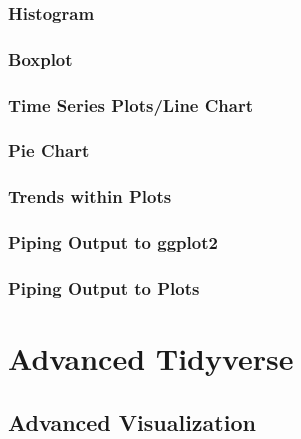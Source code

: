 \documentclass[
]{book}
\begin{document}
\hypertarget{histogram}{%
\subsection{Histogram}\label{histogram}}

\hypertarget{boxplot}{%
\subsection{Boxplot}\label{boxplot}}

\hypertarget{time-series-plotsline-chart}{%
\subsection{Time Series Plots/Line Chart}\label{time-series-plotsline-chart}}

\hypertarget{pie-chart}{%
\subsection{Pie Chart}\label{pie-chart}}

\hypertarget{trends-within-plots}{%
\subsection{Trends within Plots}\label{trends-within-plots}}

\hypertarget{piping-output-to-ggplot2}{%
\subsection{Piping Output to ggplot2}\label{piping-output-to-ggplot2}}

\hypertarget{piping-output-to-plots}{%
\subsection{Piping Output to Plots}\label{piping-output-to-plots}}

\hypertarget{tidy-2}{%
\chapter{Advanced Tidyverse}\label{tidy-2}}

\hypertarget{advanced-visualization}{%
\section{Advanced Visualization}\label{advanced-visualization}}
\end{document}
